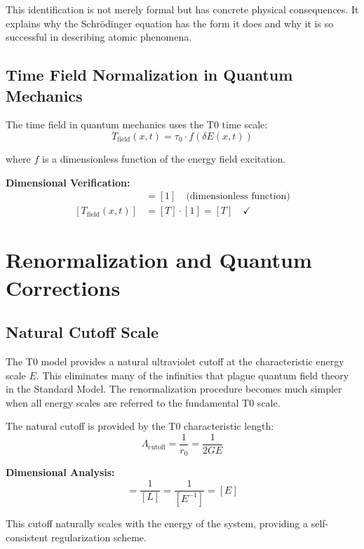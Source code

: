 \documentclass[12pt,a4paper]{report}
\begin{document}
This identification is not merely formal but has concrete physical consequences. It explains why the Schrödinger equation has the form it does and why it is so successful in describing atomic phenomena.

\subsection{Time Field Normalization in Quantum Mechanics}

The time field in quantum mechanics uses the T0 time scale:
\begin{equation}
	T_{\text{field}}(x,t) = \tau_0 \cdot f(\delta E(x,t))
\end{equation}

where $f$ is a dimensionless function of the energy field excitation.

\textbf{Dimensional Verification:}
\begin{align}
	[f(\delta E(x,t))] &= [1] \quad \text{(dimensionless function)} \\
	[T_{\text{field}}(x,t)] &= [T] \cdot [1] = [T] \quad \checkmark
\end{align}

\section{Renormalization and Quantum Corrections}

\subsection{Natural Cutoff Scale}

The T0 model provides a natural ultraviolet cutoff at the characteristic energy scale $E$. This eliminates many of the infinities that plague quantum field theory in the Standard Model. The renormalization procedure becomes much simpler when all energy scales are referred to the fundamental T0 scale.

The natural cutoff is provided by the T0 characteristic length:
\begin{equation}
	\Lambda_{\text{cutoff}} = \frac{1}{r_0} = \frac{1}{2GE}
\end{equation}

\textbf{Dimensional Analysis:}
\begin{equation}
	[\Lambda_{\text{cutoff}}] = \frac{1}{[L]} = \frac{1}{[E^{-1}]} = [E]
\end{equation}

This cutoff naturally scales with the energy of the system, providing a self-consistent regularization scheme.
\end{document}
